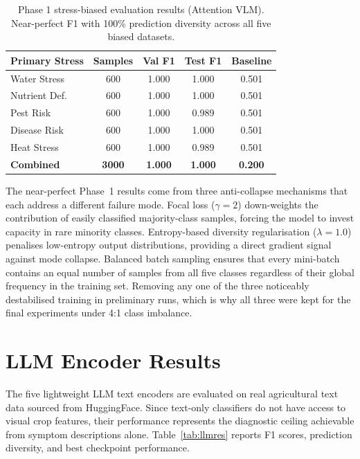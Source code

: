 \documentclass[12pt, a4paper, oneside]{Thesis}
\begin{document}
\begin{table}[htbp]\centering
\small
\begin{tabular}{lcccc}
\toprule
\textbf{Primary Stress} & \textbf{Samples} & \textbf{Val F1} & \textbf{Test F1} & \textbf{Baseline}\\
\midrule
Water Stress     & 600 & 1.000 & 1.000 & 0.501 \\
Nutrient Def.    & 600 & 1.000 & 1.000 & 0.501 \\
Pest Risk        & 600 & 1.000 & 0.989 & 0.501 \\
Disease Risk     & 600 & 1.000 & 1.000 & 0.501 \\
Heat Stress      & 600 & 1.000 & 0.989 & 0.501 \\
\midrule
\textbf{Combined} & \textbf{3000} & \textbf{1.000} & \textbf{1.000} & \textbf{0.200}\\
\bottomrule
\end{tabular}
\caption{Phase 1 stress-biased evaluation results (Attention VLM). Near-perfect F1 with 100\% prediction diversity across all five biased datasets.}
\label{tab:phase1}
\end{table}

The near-perfect Phase~1 results come from three anti-collapse mechanisms that each address a different failure mode. Focal loss ($\gamma{=}2$) down-weights the contribution of easily classified majority-class samples, forcing the model to invest capacity in rare minority classes. Entropy-based diversity regularisation ($\lambda{=}1.0$) penalises low-entropy output distributions, providing a direct gradient signal against mode collapse. Balanced batch sampling ensures that every mini-batch contains an equal number of samples from all five classes regardless of their global frequency in the training set. Removing any one of the three noticeably destabilised training in preliminary runs, which is why all three were kept for the final experiments under 4:1 class imbalance.

\clearpage
\section{LLM Encoder Results}

The five lightweight LLM text encoders are evaluated on real agricultural text data sourced from HuggingFace. Since text-only classifiers do not have access to visual crop features, their performance represents the diagnostic ceiling achievable from symptom descriptions alone. Table~\ref{tab:llmres} reports F1 scores, prediction diversity, and best checkpoint performance.
\end{document}
